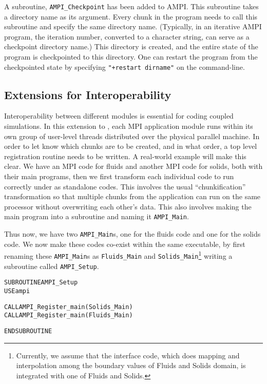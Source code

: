 \documentclass[10pt]{article}
\begin{document}
A subroutine, \texttt{AMPI\_Checkpoint} has been added to AMPI. This subroutine
takes a directory name as its argument. Every chunk in the program needs to
call this subroutine and specify the same directory name. (Typically, in an
iterative AMPI program, the iteration number, converted to a character string,
can serve as a checkpoint directory name.) This directory is created, and the
entire state of the program is checkpointed to this directory.  One can restart
the program from the checkpointed state by specifying \texttt{"+restart
dirname"} on the command-line.

\subsection{Extensions for Interoperability}

Interoperability between different modules is essential for coding coupled
simulations.  In this extension to \ampi{}, each MPI application module runs
within its own group of user-level threads distributed over the physical
parallel machine.  In order to let \ampi{} know which chunks are to be created,
and in what order, a top level registration routine needs to be written. A
real-world example will make this clear. We have an MPI code for fluids and
another MPI code for solids, both with their main programs, then we first
transform each individual code to run correctly under \ampi{} as standalone
codes. This involves the usual ``chunkification'' transformation so that
multiple chunks from the application can run on the same processor without
overwriting each other's data. This also involves making the main program into
a subroutine and naming it \texttt{AMPI\_Main}.

Thus now, we have two \texttt{AMPI\_Main}s, one for the fluids code and one for
the solids code. We now make these codes co-exist within the same executable,
by first renaming these \texttt{AMPI\_Main}s as \texttt{Fluids\_Main} and
\texttt{Solids\_Main}\footnote{Currently, we assume that the interface code,
which does mapping and interpolation among the boundary values of Fluids and
Solids domain, is integrated with one of Fluids and Solids.} writing a
subroutine called \texttt{AMPI\_Setup}.

\begin{alltt}
SUBROUTINE AMPI_Setup
  USE ampi

  CALL AMPI_Register_main(Solids_Main)
  CALL AMPI_Register_main(Fluids_Main)

END SUBROUTINE
\end{alltt}
\end{document}
